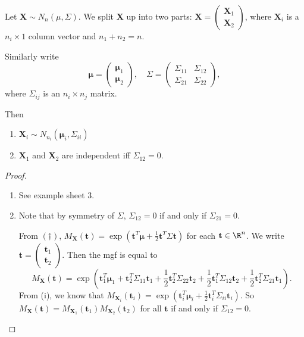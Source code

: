 \documentclass[a4paper]{article}
\begin{document}
\begin{prop}
  Let $\mathbf{X}\sim N_n(\mu, \Sigma)$. We split $\mathbf{X}$ up into two parts: $\mathbf{X} =
  \begin{pmatrix}
    \mathbf{X}_1\\
    \mathbf{X}_2
  \end{pmatrix}$, where $\mathbf{X}_i$ is a $n_i \times 1$ column vector and $n_1 + n_2 = n$.

  Similarly write
  \[
    \boldsymbol\mu =
    \begin{pmatrix}
      \boldsymbol\mu_1\\
      \boldsymbol\mu_2
    \end{pmatrix}
    ,\quad
    \Sigma =
    \begin{pmatrix}
      \Sigma_{11} & \Sigma_{12}\\
      \Sigma_{21} & \Sigma_{22}
    \end{pmatrix},
  \]
  where $\Sigma_{ij}$ is an $n_i\times n_j$ matrix.

  Then
  \begin{enumerate}
    \item $\mathbf{X}_i \sim N_{n_i}(\boldsymbol\mu_i, \Sigma_{ii})$
    \item $\mathbf{X}_1$ and $\mathbf{X}_2$ are independent iff $\Sigma_{12} = 0$.
  \end{enumerate}
\end{prop}

\begin{proof}\leavevmode
  \begin{enumerate}
    \item See example sheet 3.
    \item Note that by symmetry of $\Sigma$, $\Sigma_{12} = 0$ if and only if $\Sigma_{21} = 0$.

      From $(\dagger)$, $M_\mathbf{X}(\mathbf{t}) = \exp(\mathbf{t}^T \boldsymbol\mu + \frac{1}{2}\mathbf{t}^T\Sigma\mathbf{t})$ for each $\mathbf{t}\in \R^n$. We write $\mathbf{t} = \begin{pmatrix}\mathbf{t}_1\\\mathbf{t}_2\end{pmatrix}$. Then the mgf is equal to
      \[
        M_\mathbf{X}(\mathbf{t}) = \exp\left(\mathbf{t}_1^T\boldsymbol\mu_1 + \mathbf{t}_2^T \Sigma_{11}\mathbf{t}_1 + \frac{1}{2}\mathbf{t}_2^T \Sigma_{22}\mathbf{t}_2 + \frac{1}{2}\mathbf{t}_1^T \Sigma_{12}\mathbf{t}_2 + \frac{1}{2}\mathbf{t}_2^T \Sigma_{21}\mathbf{t}_1\right).
      \]
      From (i), we know that $M_{\mathbf{X}_i}(\mathbf{t}_i) = \exp(\mathbf{t}_i^T\boldsymbol\mu_i + \frac{1}{2}\mathbf{t}_i^T \Sigma_{ii}\mathbf{t}_i)$. So $M_\mathbf{X}(\mathbf{t}) = M_{\mathbf{X}_1}(\mathbf{t}_1)M_{\mathbf{X}_2}(\mathbf{t}_2)$ for all $\mathbf{t}$ if and only if $\Sigma_{12} = 0$.\qedhere
  \end{enumerate}
\end{proof}
\end{document}
